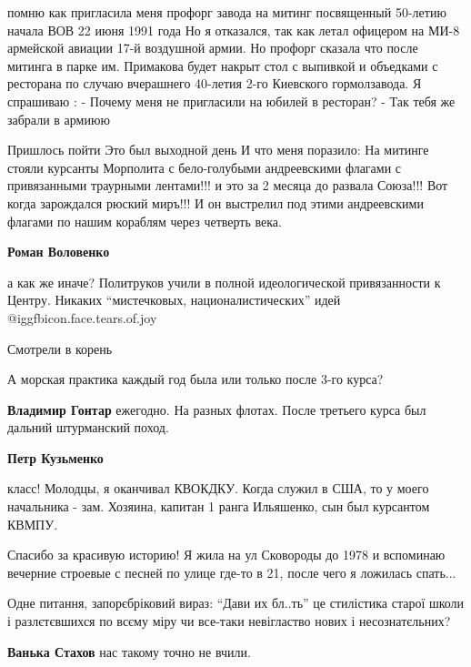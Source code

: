 \begin{itemize}
помню как пригласила меня профорг завода на митинг посвященный 50-летию начала
ВОВ 22 июня 1991 года Но я отказался, так как летал офицером на МИ-8 армейской
авиации 17-й воздушной армии. Но профорг сказала что после митинга в парке им.
Примакова будет накрыт стол с выпивкой и объедками с ресторана по случаю
вчерашнего 40-летия 2-го Киевского гормолзавода. Я спрашиваю : - Почему меня не
пригласили на юбилей в ресторан? - Так тебя же забрали в армиюю


Пришлось пойти Это был выходной день И что меня поразило: На митинге стояли
курсанты Морполита с бело-голубыми андреевскими флагами с привязанными
траурными лентами!!! и это за 2 месяца до развала Союза!!! Вот когда зарождался
рюский миръ!!! И он выстрелил под этими андреевскими флагами по нашим кораблям
через четверть века.

\begin{itemize} %
\textbf{Роман Воловенко} 

а как же иначе? Политруков учили в полной идеологической привязанности к
Центру. Никаких \enquote{мистечковых, националистических} идей  @igg{fbicon.face.tears.of.joy} 

Смотрели в корень
\end{itemize} %

А морская практика каждый год была или только после 3-го курса?

\begin{itemize} %
\textbf{Владимир Гонтар} ежегодно. На разных флотах. После третьего курса был дальний штурманский поход.

\textbf{Петр Кузьменко} 

класс! Молодцы, я оканчивал КВОКДКУ. Когда служил в США, то у моего начальника
- зам. Хозяина, капитан 1 ранга Ильяшенко, сын был курсантом КВМПУ.

\end{itemize} %


Спасибо за красивую историю! Я жила на ул Сковороды до 1978 и вспоминаю
вечерние строевые с песней по улице где-то в 21, после чего я ложилась
спать...


Одне питання, запорєбріковий вираз: \enquote{Дави их бл..ть} це стилістика старої
школи і разлєтєвшихся по всєму міру чи все-таки невігластво нових і
несознатєльних?

\textbf{Ванька Стахов} нас такому точно не вчили.

\end{itemize} %
